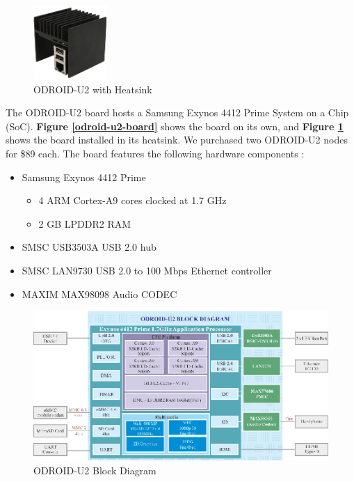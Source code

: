 \documentclass[11pt]{book}
\begin{document}
\begin{figure}[h]
\centering
\includegraphics[width=0.25\textwidth]{odroid_u2}
\caption{ODROID-U2 with Heatsink \cite{odroid-u2-board-detail}}
\label{odroid-u2}
\end{figure}

The ODROID-U2 board hosts a Samsung Exynos 4412 Prime System on a Chip
(SoC). \textbf{Figure \ref{odroid-u2-board}} shows the board on its own, and
\textbf{Figure \ref{odroid-u2}} shows the board installed in its heatsink. We
purchased two ODROID-U2 nodes for \$89 each. The board features the following
hardware components \cite{odroid-u2-board-detail}:

\begin{itemize}
\item Samsung Exynos 4412 Prime
  \begin{itemize}
  \item 4 ARM Cortex-A9 cores clocked at 1.7 GHz
  \item 2 GB LPDDR2 RAM
  \end{itemize}
\item SMSC USB3503A USB 2.0 hub
\item SMSC LAN9730 USB 2.0 to 100 Mbps Ethernet controller
\item MAXIM MAX98098 Audio CODEC
\end{itemize}

\begin{figure}[h]
\centering
\includegraphics[width=\textwidth]{odroid_u2_block_diagram}
\caption{ODROID-U2 Block Diagram \cite{odroid-u2-board-detail}}
\label{odroid-u2-block-diagram}
\end{figure}
\end{document}
